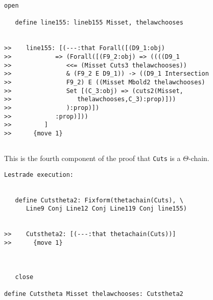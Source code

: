 \documentclass[12pt]{article}
\begin{document}
\begin{verbatim}
open

   define line155: lineb155 Misset, thelawchooses


>>    line155: [(---:that Forall([(D9_1:obj)
>>            => (Forall([(F9_2:obj) => ((((D9_1
>>               <<= (Misset Cuts3 thelawchooses))
>>               & (F9_2 E D9_1)) -> ((D9_1 Intersection
>>               F9_2) E ((Misset Mbold2 thelawchooses)
>>               Set [(C_3:obj) => (cuts2(Misset,
>>                  thelawchooses,C_3):prop)]))
>>               ):prop)])
>>            :prop)]))
>>         ]
>>      {move 1}


\end{verbatim}

This is the fourth component of the proof that {\tt Cuts} is a $\Theta$-chain.

\begin{verbatim}Lestrade execution:


   define Cutstheta2: Fixform(thetachain(Cuts), \
      Line9 Conj Line12 Conj Line119 Conj line155)


>>    Cutstheta2: [(---:that thetachain(Cuts))]
>>      {move 1}



   close

define Cutstheta Misset thelawchooses: Cutstheta2



\end{verbatim}
\end{document}
